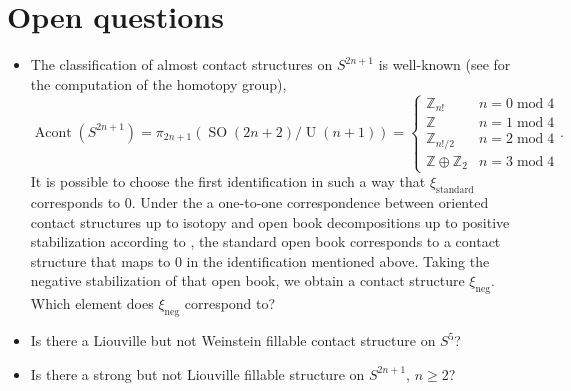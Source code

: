 \documentclass{amsart}
\begin{document}
\section*{Open questions}
\begin{itemize}
    \item The classification of almost contact structures on $S^{2n+1}$ is well-known (see \cite{Harris63} for the computation of the homotopy group),
    \[
        \operatorname{Acont}\left(S^{2n+1}\right) = \pi_{2n+1}(\operatorname{SO}(2n + 2)/\operatorname{U}(n + 1)) = \begin{cases}
            \mathbb Z_{n!} &n = 0 \operatorname{mod} 4\\
            \mathbb Z &n = 1 \operatorname{mod} 4\\
            \mathbb Z_{n!/2} &n = 2 \operatorname{mod} 4\\
            \mathbb Z \oplus \mathbb Z_2 &n = 3 \operatorname{mod} 4
        \end{cases}.
    \]
    It is possible to choose the first identification in such a way that $\xi_{\mathrm{standard}}$ corresponds to $0$.
    Under the a one-to-one correspondence between oriented contact structures up to isotopy
    and open book decompositions up to positive stabilization according to \cite{Giroux02}, the standard open book corresponds to a contact structure that maps to $0$ in the identification mentioned above.
    Taking the negative stabilization of that open book, we obtain a contact structure $\xi_\mathrm{neg}$. Which element does $\xi_\mathrm{neg}$ correspond to?
    \item Is there a Liouville but not Weinstein fillable contact structure on $S^5$?
    \item Is there a strong but not Liouville fillable structure on $S^{2n+1}$, $n \ge 2$?
\end{itemize}
\newpage


\end{document}
